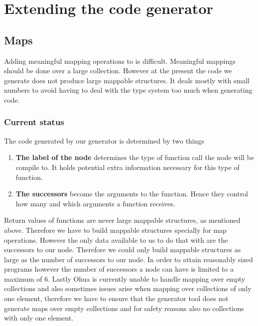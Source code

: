 \chapter{Extending the code generator}

\label{ch:extending-code-generator}

\section{Maps}

Adding meaningful mapping operations to is difficult.
Meaningful mappings should be done over a large collection.
However at the present the code we generate does not produce large mappable structures.
It deals mostly with small numbers to avoid having to deal with the type system too much when generating code.

\subsection{Current status}

The code generated by our generator is determined by two things

\begin{enumerate}
    \item \textbf{The label of the node} determines the type of function call the node will be compile to.
          It holds potential extra information necessary for this type of function.
    \item \textbf{The successors} become the arguments to the function. Hence they control how many and which arguments a function receives.
\end{enumerate}

Return values of functions are never large mappable structures, as mentioned above.
Therefore we have to build mappable structures specially for map operations.
However the only data available to us to do that with are the successors to our node.
Therefore we could only build mappable structures as large as the number of successors to our node.
In order to attain reasonably sized programs however the number of successors a node can have is limited to a maximum of 6.
Lastly Ohua is currently unable to handle mapping over empty collections and also sometimes issues arise when mapping over collections of only one element, therefore we have to ensure that the generator tool does not generate maps over empty collections and for safety reasons also no collections with only one element.

